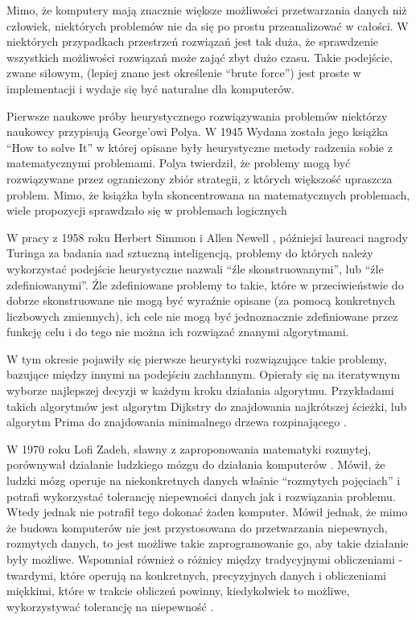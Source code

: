\documentclass[twoside]{iisthesis}
\begin{document}
Mimo, że komputery mają znacznie większe możliwości przetwarzania danych niż człowiek, niektórych problemów nie da się po prostu przeanalizować w całości. W niektórych przypadkach przestrzeń rozwiązań jest tak duża, że sprawdzenie wszystkich możliwości rozwiązań może zająć zbyt dużo czasu. Takie podejście, zwane siłowym, (lepiej znane jest określenie ``brute force'') jest proste w implementacji i wydaje się być naturalne dla komputerów.

Pierwsze naukowe próby heurystycznego rozwiązywania problemów niektórzy naukowcy \cite{history-meta} przypisują George'owi Polya. W 1945 Wydana została jego książka ``How to solve It'' \cite{polya} w której opisane były heurystyczne metody radzenia sobie z matematycznymi problemami. Polya twierdził, że problemy mogą być rozwiązywane przez ograniczony zbiór strategii, z których większość upraszcza problem. Mimo, że książka była skoncentrowana na matematycznych problemach, wiele propozycji sprawdzało się w problemach logicznych

W pracy z 1958 roku Herbert Simmon i Allen Newell \cite{simon1958heuristic}, późniejsi laureaci nagrody Turinga za badania nad sztuczną inteligencją, problemy do których należy wykorzystać podejście heurystyczne nazwali ``źle skonstruowanymi'', lub ``źle zdefiniowanymi''. Źle zdefiniowane problemy to takie, które w przeciwieństwie do dobrze skonstruowane nie mogą być wyraźnie opisane (za pomocą konkretnych liczbowych zmiennych), ich cele nie mogą być jednoznacznie zdefiniowane przez funkcję celu i do tego nie można ich rozwiązać znanymi algorytmami. 

W tym okresie pojawiły się pierwsze heurystyki rozwiązujące takie problemy, bazujące między innymi na podejściu zachłannym. Opierały się na iteratywnym wyborze najlepszej decyzji w każdym kroku działania algorytmu. Przykładami takich algorytmów jest algorytm Dijkstry do znajdowania najkrótszej ścieżki, lub algorytm Prima do znajdowania minimalnego drzewa rozpinającego \cite{Cormen:2001:IA:580470}. 

W 1970 roku Lofi Zadeh, sławny z zaproponowania matematyki rozmytej, porównywał działanie ludzkiego mózgu do działania komputerów \cite{proc-zadeh}. Mówił, że ludzki mózg operuje na niekonkretnych danych właśnie ``rozmytych pojęciach'' i potrafi wykorzystać tolerancję niepewności danych jak i rozwiązania problemu. Wtedy jednak nie potrafił tego dokonać żaden komputer. Mówił jednak, że mimo że budowa komputerów nie jest przystosowana do przetwarzania niepewnych, rozmytych danych, to jest możliwe takie zaprogramowanie go, aby takie działanie były możliwe. Wspomniał również o różnicy między tradycyjnymi obliczeniami - twardymi, które operują na konkretnych, precyzyjnych danych i obliczeniami miękkimi, które w trakcie obliczeń powinny, kiedykolwiek to możliwe, wykorzystywać tolerancję na niepewność \cite{history-soft}. 
\end{document}
